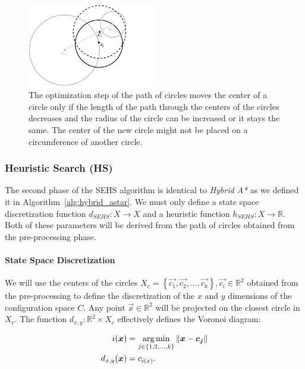 \begin{figure}
	\centering
	\includegraphics[width=0.5\textwidth]{../img/se_optimization_step}
	\caption{The optimization step of the path of circles moves the center of a circle only if the length of the path through the centers of the circles decreases and the radius of the circle can be increased or it stays the same. The center of the new circle might not be placed on a circumference of another circle.}
	\label{fig:sehs_space_exploration_optimization}
\end{figure}

\subsubsection{Heuristic Search (HS)}
\label{sec:heuristic-search}

The second phase of the \gls*{SEHS} algorithm is identical to \textit{Hybrid A*} as we defined it in Algorithm~\ref{alg:hybrid_astar}. We must only define a state space discretization function $d_{SEHS}: X\rightarrow X$ and a heuristic function $h_{SEHS}: X\rightarrow \mathbb{R}$. Both of these parameters will be derived from the path of circles obtained from the pre-processing phase.

\paragraph{State Space Discretization}
We will use the centers of the circles $X_c=\left\{\vec{c_1}, \vec{c_2}, \ldots, \vec{c_k} \right\}, \vec{c_i}\in\mathbb{R}^2$ obtained from the pre-processing to define the discretization of the $x$ and $y$ dimensions of the configuration space $C$. Any point $\vec{x}\in \mathbb{R}^2$ will be projected on the closest circle in $X_c$. The function $d_{x,y}:\mathbb{R}^2\times X_c$ effectively defines the Voronoi diagram:

\begin{equation*}
\begin{aligned}
i(\bm{x})&=\operatorname*{arg\,min}_{j\in \left\{1, 2, \ldots, k\right\}} \left\lVert\bm{x}-\bm{c_j}\right\rVert \\
d_{x,y}(\bm{x})&=c_{i(x)}.
\end{aligned}
\end{equation*}


